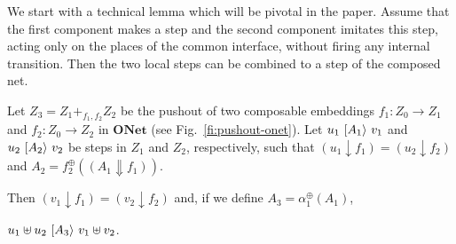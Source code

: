 \documentclass{LMCS}
\newcommand{\mjoin}{\ensuremath{\uplus}}
\newcommand{\monSub}[2]{\ensuremath{{#1}_{#2}^\oplus}}
\newcommand{\res}[2]{\ensuremath{({#1}\!\downarrow\!{#2})}}
\newcommand{\sres}[2]{\ensuremath{({#1}\!\Downarrow\!{#2})}}
\newcommand{\comp}[1]{\ensuremath{+}_{#1}}
\newcommand{\trans}[1]{\ensuremath{\ [\/{#1}\/\rangle}\ }
\newcommand{\onet}{\ensuremath{\mathbf{ONet}}}
\begin{document}
We start with a technical lemma which will be pivotal in the paper.
Assume that the first component makes a step and the second component
imitates this step, acting only on the places of the common interface,
without firing any internal transition. Then the two local steps can
be combined to a step of the composed net.

\begin{lem}
  \label{le:downup}
  Let $Z_3 = Z_1 \comp{f_1,f_2} Z_2$ be the pushout of two composable
  embeddings $f_1 : Z_0 \to Z_1$ and $f_2 : Z_0 \to Z_2$ in $\onet$ 
  (see Fig.~\ref{fi:pushout-onet}).
Let $u_1 \trans{A_1} v_1$ and $u_2 \trans{A_2} v_2$ be steps in
  $Z_1$ and $Z_2$, respectively, such that $\res{u_1}{f_1} =
  \res{u_2}{f_2}$ and $A_2 = \monSub{f}{2}(\sres{A_1}{f_1})$.

  Then $\res{v_1}{f_1} = \res{v_2}{f_2}$ and, if we define $A_3 =
  \monSub{\alpha}{1}(A_1)$,

  \begin{center}
    $u_1 \mjoin u_2 \trans{A_3} v_1 \mjoin v_2$.
  \end{center}
\end{lem}
\end{document}
